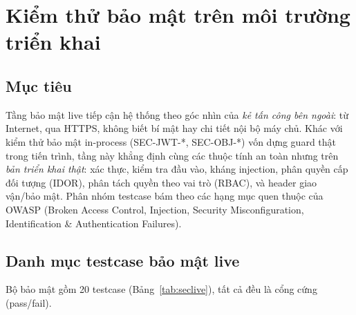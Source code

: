\documentclass[12pt,a4paper]{article}
\begin{document}
\section{Kiểm thử bảo mật trên môi trường triển khai}
\label{sec:sec-live}

\subsection{Mục tiêu}

Tầng bảo mật live tiếp cận hệ thống theo góc nhìn của \emph{kẻ tấn công bên ngoài}: từ Internet, qua HTTPS,
không biết bí mật hay chi tiết nội bộ máy chủ. Khác với kiểm thử bảo mật in-process (SEC-JWT-*, SEC-OBJ-*)
vốn dựng guard thật trong tiến trình, tầng này khẳng định cùng các thuộc tính an toàn nhưng trên \emph{bản
triển khai thật}: xác thực, kiểm tra đầu vào, kháng injection, phân quyền cấp đối tượng (IDOR), phân tách
quyền theo vai trò (RBAC), và header giao vận/bảo mật. Phân nhóm testcase bám theo các hạng mục quen thuộc
của OWASP (Broken Access Control, Injection, Security Misconfiguration, Identification \& Authentication
Failures).

\subsection{Danh mục testcase bảo mật live}

Bộ bảo mật gồm 20 testcase (Bảng~\ref{tab:seclive}), tất cả đều là cổng cứng (pass/fail).
\end{document}
